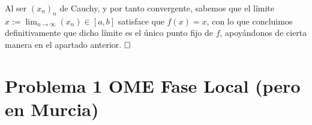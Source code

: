 \documentclass{article}
\begin{document}
\newpage

Al ser $(x_n)_n$ de Cauchy, y por tanto convergente, sabemos que el límite $x := \lim_{n \to \infty} (x_n) \in [a, b]$ satisface que $f(x) = x$, con lo que concluimos definitivamente que dicho límite es el único punto fijo de $f$, apoyándonos de cierta manera en el apartado anterior. $\hfill\square$







\newpage

\section{Problema 1 OME Fase Local (pero en Murcia)}
\end{document}
